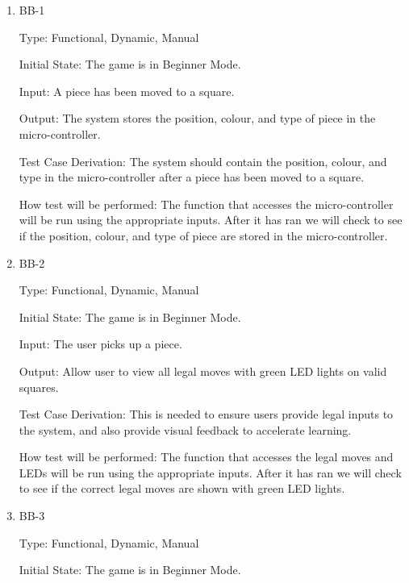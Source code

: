 \documentclass[12pt, titlepage]{article}
\begin{document}
  \begin{enumerate}

    \item{BB-1\\}

    Type: Functional, Dynamic, Manual
                        
    Initial State: The game is in Beginner Mode.
                        
    Input: A piece has been moved to a square.
                        
    Output: The system stores the position, colour, and type of piece in the micro-controller.
                        
    Test Case Derivation: The system should contain the position, colour, and type in the micro-controller
    after a piece has been moved to a square.

    How test will be performed: The function that accesses the micro-controller will be run using the appropriate inputs.
    After it has ran we will check to see if the position, colour, and type of piece are stored in the micro-controller.  

    \item{BB-2\\}

    Type: Functional, Dynamic, Manual
                        
    Initial State: The game is in Beginner Mode.
                        
    Input: The user picks up a piece.
                        
    Output: Allow user to view all legal moves with green LED
    lights on valid squares.
                        
    Test Case Derivation: This is needed to ensure users provide legal inputs to the system,
    and also provide visual feedback to accelerate learning.

    How test will be performed: The function that accesses the legal moves and LEDs will be run using the appropriate inputs.
    After it has ran we will check to see if the correct legal moves are shown with green LED lights.  

    \item{BB-3\\}

    Type: Functional, Dynamic, Manual
                        
    Initial State: The game is in Beginner Mode.
                        

\end{enumerate}
\end{document}
